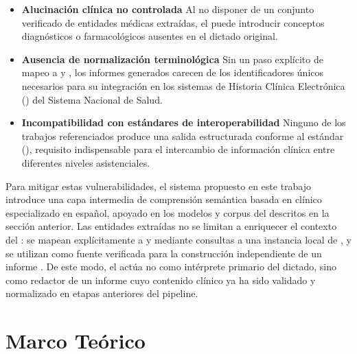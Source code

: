 \begin{itemize}
    \item \textbf{Alucinación clínica no controlada} Al no disponer de un conjunto 
    verificado de entidades médicas extraídas, el  puede introducir 
    conceptos diagnósticos o farmacológicos ausentes en el dictado original.

    \item \textbf{Ausencia de normalización terminológica} Sin un paso explícito de 
    mapeo a  y , los informes generados 
    carecen de los identificadores únicos necesarios para su integración en los sistemas 
    de Historia Clínica Electrónica () del Sistema Nacional de Salud.

    \item \textbf{Incompatibilidad con estándares de interoperabilidad} Ninguno de los 
    trabajos referenciados produce una salida estructurada conforme al estándar
     (), requisito indispensable
    para el intercambio de información clínica entre diferentes niveles asistenciales.
\end{itemize}

Para mitigar estas vulnerabilidades, el sistema propuesto en este trabajo introduce una 
capa intermedia de comprensión semántica basada en  clínico especializado 
en español, apoyado en los modelos y corpus del  descritos en la sección 
anterior. Las entidades extraídas no se limitan a enriquecer el contexto del 
: se mapean explícitamente a  y 
 mediante consultas a una instancia local de 
, y se utilizan como fuente verificada para la construcción 
independiente de un informe . De este modo, el  
actúa no como intérprete primario del dictado, sino como redactor de un informe cuyo 
contenido clínico ya ha sido validado y normalizado en etapas anteriores del pipeline.

\section{Marco Teórico}

